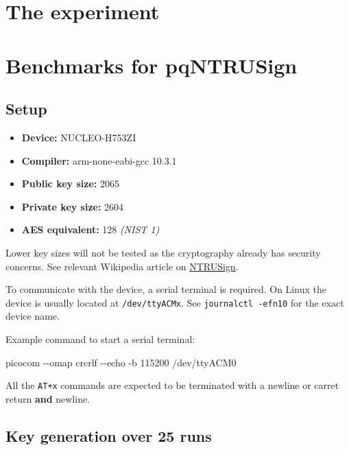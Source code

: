 \documentclass[
]{article}
\newenvironment{Shaded}{}{}
\newcommand{\ExtensionTok}[1]{#1}
\newcommand{\NormalTok}[1]{#1}
\providecommand{\tightlist}{%
  \setlength{\itemsep}{0pt}\setlength{\parskip}{0pt}}
\begin{document}
\hypertarget{the-experiment}{%
\section{The experiment}
\label{the-experiment}}

\hypertarget{benchmarks-for-pqntrusign}{%
\section{Benchmarks for pqNTRUSign}\label{benchmarks-for-pqntrusign}}

\hypertarget{setup}{%
\subsection{Setup}\label{setup}}

\begin{itemize}
\tightlist
\item
  \textbf{Device:} NUCLEO-H753ZI
\item
  \textbf{Compiler:} arm-none-eabi-gcc 10.3.1
\item
  \textbf{Public key size:} 2065
\item
  \textbf{Private key size:} 2604
\item
  \textbf{AES equivalent:} 128 \textit{(NIST 1)}
\end{itemize}

Lower key sizes will not be tested as the cryptography already
has security concerns.
See relevant Wikipedia article on
\href{https://en.wikipedia.org/wiki/NTRUSign}{NTRUSign}.

To communicate with the device, a serial terminal is required. On Linux
the device is usually located at \texttt{/dev/ttyACMx}. See
\texttt{journalctl\ -efn10} for the exact device name.

Example command to start a serial terminal:

\begin{Shaded}
\begin{Highlighting}[]
\ExtensionTok{picocom}\NormalTok{ {-}{-}omap crcrlf {-}{-}echo {-}b 115200 /dev/ttyACM0}
\end{Highlighting}
\end{Shaded}

All the \texttt{AT+x} commands are expected to be terminated with a
newline or carret return \textbf{and} newline.

\hypertarget{key-generation-over-25-runs}{%
\subsection{Key generation over 25
runs}\label{key-generation-over-25-runs}}
\end{document}

